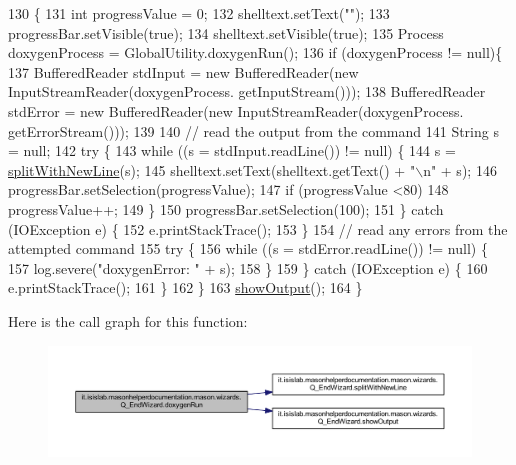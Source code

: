 \begin{DoxyCode}
130                               \{
131         \textcolor{keywordtype}{int} progressValue = 0;
132         shelltext.setText(\textcolor{stringliteral}{""});
133         progressBar.setVisible(\textcolor{keyword}{true});
134         shelltext.setVisible(\textcolor{keyword}{true});
135         Process doxygenProcess = GlobalUtility.doxygenRun();
136         \textcolor{keywordflow}{if} (doxygenProcess != null)\{
137             BufferedReader stdInput = \textcolor{keyword}{new} BufferedReader(\textcolor{keyword}{new} InputStreamReader(doxygenProcess.
      getInputStream()));
138             BufferedReader stdError = \textcolor{keyword}{new} BufferedReader(\textcolor{keyword}{new} InputStreamReader(doxygenProcess.
      getErrorStream()));
139 
140             \textcolor{comment}{// read the output from the command}
141             String s = null;
142             \textcolor{keywordflow}{try} \{
143                 \textcolor{keywordflow}{while} ((s = stdInput.readLine()) != null) \{
144                     s = \hyperlink{classit_1_1isislab_1_1masonhelperdocumentation_1_1mason_1_1wizards_1_1_q___end_wizard_a1cdec1efdad895973386d4679b790a1c}{splitWithNewLine}(s);
145                     shelltext.setText(shelltext.getText() + \textcolor{stringliteral}{"\(\backslash\)n"} + s);
146                     progressBar.setSelection(progressValue);
147                     \textcolor{keywordflow}{if} (progressValue <80)
148                         progressValue++;
149                 \}
150                 progressBar.setSelection(100);
151             \} \textcolor{keywordflow}{catch} (IOException e) \{
152                 e.printStackTrace();
153             \}
154             \textcolor{comment}{// read any errors from the attempted command}
155             \textcolor{keywordflow}{try} \{
156                 \textcolor{keywordflow}{while} ((s = stdError.readLine()) != null) \{                 
157                     log.severe(\textcolor{stringliteral}{"doxygenError: "} + s);
158                 \}
159             \} \textcolor{keywordflow}{catch} (IOException e) \{
160                 e.printStackTrace();
161             \}
162         \}
163         \hyperlink{classit_1_1isislab_1_1masonhelperdocumentation_1_1mason_1_1wizards_1_1_q___end_wizard_a944a5732f2c5ba72de80c4bd014c3afb}{showOutput}();
164     \}
\end{DoxyCode}


Here is the call graph for this function\-:
\nopagebreak
\begin{figure}[H]
\begin{center}
\leavevmode
\includegraphics[width=350pt]{classit_1_1isislab_1_1masonhelperdocumentation_1_1mason_1_1wizards_1_1_q___end_wizard_a5711bf4858bd7e5787743ec96669a19d_cgraph}
\end{center}
\end{figure}




